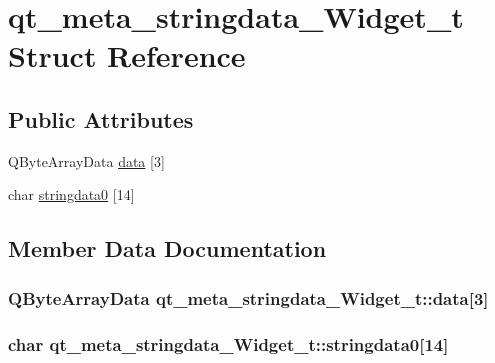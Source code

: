 \hypertarget{structqt__meta__stringdata___widget__t}{}\section{qt\_meta\_stringdata\_Widget\_t Struct Reference}
\label{structqt__meta__stringdata___widget__t}
\subsection*{Public Attributes}
\begin{DoxyCompactItemize}
\item 
QByteArrayData \hyperlink{structqt__meta__stringdata___widget__t_ae21052b7ec9e52d41a6fad5351c87ffc}{data} \mbox{[}3\mbox{]}
\item 
char \hyperlink{structqt__meta__stringdata___widget__t_a6c44677d08b68447369955e1bddad625}{stringdata0} \mbox{[}14\mbox{]}
\end{DoxyCompactItemize}


\subsection{Member Data Documentation}
\subsubsection[{\texorpdfstring{data}{data}}]{\setlength{\rightskip}{0pt plus 5cm}QByteArrayData qt\_meta\_stringdata\_Widget\_t::data\mbox{[}3\mbox{]}}\hypertarget{structqt__meta__stringdata___widget__t_ae21052b7ec9e52d41a6fad5351c87ffc}{}\label{structqt__meta__stringdata___widget__t_ae21052b7ec9e52d41a6fad5351c87ffc}
\subsubsection[{\texorpdfstring{stringdata0}{stringdata0}}]{\setlength{\rightskip}{0pt plus 5cm}char qt\_meta\_stringdata\_Widget\_t::stringdata0\mbox{[}14\mbox{]}}\hypertarget{structqt__meta__stringdata___widget__t_a6c44677d08b68447369955e1bddad625}{}\label{structqt__meta__stringdata___widget__t_a6c44677d08b68447369955e1bddad625}
